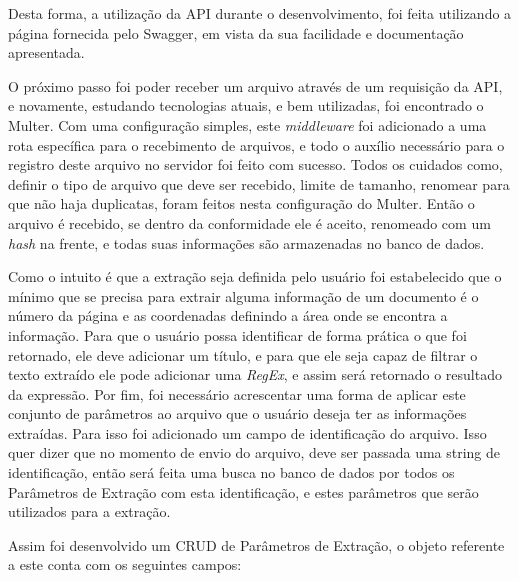 Desta forma, a utilização da API durante o desenvolvimento, foi feita utilizando a página fornecida pelo Swagger, em vista da sua facilidade e documentação apresentada.

O próximo passo foi poder receber um arquivo através de um requisição da API, e novamente, estudando tecnologias atuais, e bem utilizadas, foi encontrado o Multer. Com uma configuração simples, este \textit{middleware} foi adicionado a uma rota específica para o recebimento de arquivos, e todo o auxílio necessário para o registro deste arquivo no servidor foi feito com sucesso. Todos os cuidados como, definir o tipo de arquivo que deve ser recebido, limite de tamanho, renomear para que não haja duplicatas, foram feitos nesta configuração do Multer. Então o arquivo é recebido, se dentro da conformidade ele é aceito, renomeado com um \textit{hash} na frente, e todas suas informações são armazenadas no banco de dados.

Como o intuito é que a extração seja definida pelo usuário foi estabelecido que o mínimo que se precisa para extrair alguma informação de um documento é o número da página e as coordenadas definindo a área onde se encontra a informação. Para que o usuário possa identificar de forma prática o que foi retornado, ele deve adicionar um título, e para que ele seja capaz de filtrar o texto extraído ele pode adicionar uma \textit{RegEx}, e assim será retornado o resultado da expressão. Por fim, foi necessário acrescentar uma forma de aplicar este conjunto de parâmetros ao arquivo que o usuário deseja ter as informações extraídas. Para isso foi adicionado um campo de identificação do arquivo. Isso quer dizer que no momento de envio do arquivo, deve ser passada uma string de identificação, então será feita uma busca no banco de dados por todos os Parâmetros de Extração com esta identificação, e estes parâmetros que serão utilizados para a extração.

Assim foi desenvolvido um CRUD de Parâmetros de Extração, o objeto referente a este conta com os seguintes campos:


